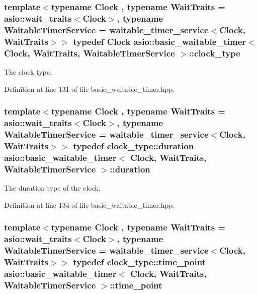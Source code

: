\subsubsection[{clock\+\_\+type}]{\setlength{\rightskip}{0pt plus 5cm}template$<$typename Clock , typename Wait\+Traits  = asio\+::wait\+\_\+traits$<$\+Clock$>$, typename Waitable\+Timer\+Service  = waitable\+\_\+timer\+\_\+service$<$\+Clock, Wait\+Traits$>$$>$ typedef Clock {\bf asio\+::basic\+\_\+waitable\+\_\+timer}$<$ Clock, Wait\+Traits, Waitable\+Timer\+Service $>$\+::{\bf clock\+\_\+type}}\label{classasio_1_1basic__waitable__timer_a1b74d12daabb5d3791f7aa42a7bdbd11}


The clock type. 



Definition at line 131 of file basic\+\_\+waitable\+\_\+timer.\+hpp.

\hypertarget{classasio_1_1basic__waitable__timer_a3ab0ae5bdf928106cd6ea19fcd4f5d49}{}
\subsubsection[{duration}]{\setlength{\rightskip}{0pt plus 5cm}template$<$typename Clock , typename Wait\+Traits  = asio\+::wait\+\_\+traits$<$\+Clock$>$, typename Waitable\+Timer\+Service  = waitable\+\_\+timer\+\_\+service$<$\+Clock, Wait\+Traits$>$$>$ typedef clock\+\_\+type\+::duration {\bf asio\+::basic\+\_\+waitable\+\_\+timer}$<$ Clock, Wait\+Traits, Waitable\+Timer\+Service $>$\+::{\bf duration}}\label{classasio_1_1basic__waitable__timer_a3ab0ae5bdf928106cd6ea19fcd4f5d49}


The duration type of the clock. 



Definition at line 134 of file basic\+\_\+waitable\+\_\+timer.\+hpp.

\hypertarget{classasio_1_1basic__waitable__timer_a6f5aadc1aba86956b544ce107cfb49b0}{}
\subsubsection[{time\+\_\+point}]{\setlength{\rightskip}{0pt plus 5cm}template$<$typename Clock , typename Wait\+Traits  = asio\+::wait\+\_\+traits$<$\+Clock$>$, typename Waitable\+Timer\+Service  = waitable\+\_\+timer\+\_\+service$<$\+Clock, Wait\+Traits$>$$>$ typedef clock\+\_\+type\+::time\+\_\+point {\bf asio\+::basic\+\_\+waitable\+\_\+timer}$<$ Clock, Wait\+Traits, Waitable\+Timer\+Service $>$\+::{\bf time\+\_\+point}}\label{classasio_1_1basic__waitable__timer_a6f5aadc1aba86956b544ce107cfb49b0}


